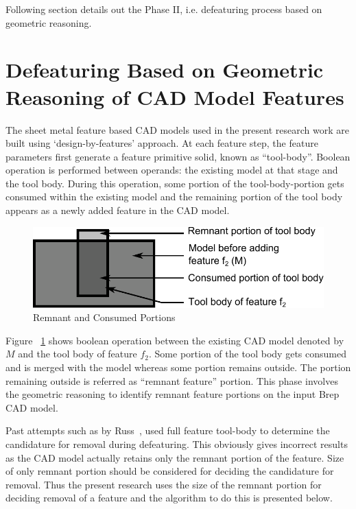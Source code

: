 Following section details out the Phase II, i.e. defeaturing process based on geometric reasoning.

 
\section{Defeaturing Based on Geometric Reasoning of CAD Model Features} \label{sec:defeaturing:phase2}


The sheet metal feature based CAD models used in the present research work are built using `design-by-features' approach. At each feature step, the feature parameters first generate a feature primitive solid, known as ``tool-body''. Boolean operation is  performed between operands: the existing model at that stage and the tool body. During this operation, some portion of the tool-body-portion gets consumed within the existing model and the remaining portion of the tool body appears as a newly added feature in the CAD model. 



 	\begin{figure} [!h]
		\centering
\includegraphics[width=0.62\linewidth,valign=t]{../Common/images/Solid_Simple_SmallProtrusion_labels_2.pdf}
		\caption{Remnant and Consumed Portions} \label{fig_remnant}
	\end{figure}
	

Figure ~\ref{fig_remnant} shows boolean operation between the existing CAD model denoted by  $M$ and the tool body of feature $f_2$. Some portion of the tool body gets consumed and is merged with the model whereas some portion remains outside. The portion remaining outside is referred as ``remnant feature'' portion. This phase involves the geometric reasoning to identify remnant feature portions on the input Brep CAD model.

Past attempts such as by Russ~\cite{Russ2012}, used full feature tool-body to determine the candidature for removal during defeaturing. This obviously gives incorrect results as the CAD model actually retains only the remnant portion of the feature. Size of only remnant portion should be considered for deciding the candidature for removal. Thus the present research  uses the size of the remnant portion for deciding removal of a feature and the algorithm to do this is presented below.


